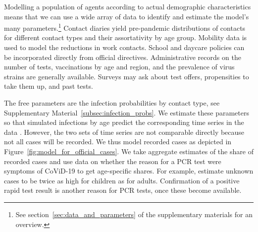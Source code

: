 Modelling a population of agents according to actual demographic characteristics means
that we can use a wide array of data to identify and estimate the model's many
parameters.\footnote{See section~\ref{sec:data_and_parameters} of the supplementary
    materials for an overview.} Contact diaries yield pre-pandemic distributions of contacts
for different contact types and their assortativity by age group. Mobility data is used
to model the reductions in work contacts. School and daycare policies can be
incorporated directly from official directives. Administrative records on the number of
tests, vaccinations by age and region, and the prevalence of virus strains are generally
available. Surveys may ask about test offers, propensities to take them up, and past
tests.

The free parameters are the infection probabilities by contact type, see Supplementary
Material~\ref{subsec:infection_probs}. We estimate these parameters so that  simulated
infections by age predict the corresponding time series in the data \citep[See][for the
    general method]{McFadden1989}. However, the two sets of time series are not comparable
directly because not all cases will be recorded. We thus model recorded cases as
depicted in Figure~\ref{fig:model_for_official_cases}. We take aggregate estimates of
the share of recorded cases and use data on whether the reason for a PCR test were
symptoms of CoViD-19 to get age-specific shares. For example,
 estimate
unknown cases to be twice as high for children as for adults. Confirmation of a positive
rapid test result is another reason for PCR tests, once these become available.

